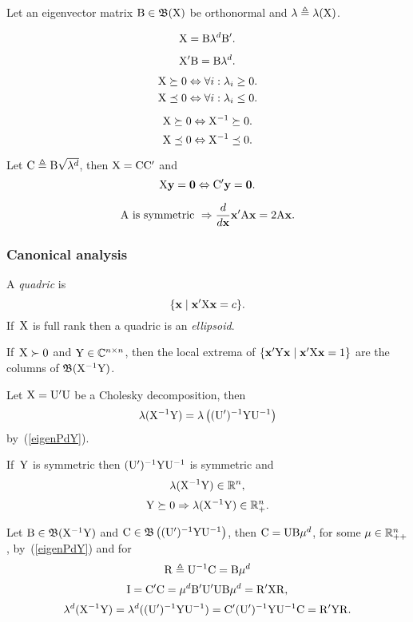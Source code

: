 \documentclass[10pt,a4paper]{article}
\theoremstyle{plain} \newtheorem{Lem}{Lemma}
\begin{document}
Let an eigenvector matrix $\mathrm B \in \mathfrak B (\mathrm X)$ be orthonormal and $\mathbf \lambda \triangleq \mathbf \lambda (\mathrm X)$.

$$  \mathrm X = \mathrm B \mathbf \lambda^d \mathrm B'. $$

$$ \mathrm X' \mathrm B = \mathrm B \mathbf \lambda^d. $$

$$ \mathrm X \succeq 0 \Leftrightarrow \forall i : \lambda_i \ge 0. $$
$$ \mathrm X \preceq 0 \Leftrightarrow \forall i : \lambda_i \le 0. $$

$$ \mathrm X \succeq 0 \Leftrightarrow \mathrm X^{-1} \succeq 0. $$
$$ \mathrm X \preceq 0 \Leftrightarrow \mathrm X^{-1} \preceq 0. $$

Let $\mathrm C \triangleq \mathrm B \sqrt{\mathbf \lambda^d}$,
then $\mathrm X = \mathrm C \mathrm C'$
and
\begin{equation*}
\mathrm X \mathbf y = \mathbf 0 \Leftrightarrow \mathrm C' \mathbf y = \mathbf 0.
\end{equation*}

$$ \mathrm A \text{ is symmetric } \Rightarrow \frac d {d \mathbf x} \mathbf x' \mathrm A \mathbf x = 2 \mathrm A \mathbf x. $$


\subsubsection{Canonical analysis}  \label{CanonicalAnalysis}
A {\em quadric} is
$$ \{\mathbf x \mid \mathbf x' \mathrm X \mathbf x = c\}. $$
If~$\mathrm X$ is full rank then a quadric is an {\em ellipsoid}.

If~$\mathrm X \succ 0$ and $\mathrm Y \in \mathbb C^{n \times n}$, 
then the local extrema of $\{\mathbf x' \mathrm Y \mathbf x \mid \mathbf x' \mathrm X \mathbf x = 1\}$
are the columns of $\mathfrak B(\mathrm X^{-1} \mathrm Y)$.

Let $\mathrm X = \mathrm U' \mathrm U$ be a Cholesky decomposition,
then
$$\mathbf \lambda(\mathrm X^{-1} \mathrm Y) = \mathbf \lambda \left((\mathrm U')^{-1} \mathrm Y \mathrm U^{-1} \right)$$
by~(\ref{eigenPdY}).

\bigskip
If~$\mathrm Y$ is symmetric then $(\mathrm U')^{-1} \mathrm Y \mathrm U^{-1}$ is symmetric
and
$$\mathbf \lambda(\mathrm X^{-1} \mathrm Y) \in \mathbb R^n,$$ 
$$\mathrm Y \succeq 0 \Rightarrow \mathbf \lambda(\mathrm X^{-1} \mathrm Y) \in \mathbb R_+^n.$$ 

Let  $\mathrm B \in \mathfrak B(\mathrm X^{-1} \mathrm Y)$ and $\mathrm C \in \mathfrak B \left((\mathrm U')^{-1} \mathrm Y \mathrm U^{-1} \right)$,
then $\mathrm C = \mathrm U \mathrm B \mathbf \mu^d$, for some $\mathbf \mu \in \mathbb R_{++}^n$, by~(\ref{eigenPdY}) and
for $$ \mathrm R \triangleq \mathrm U^{-1} \mathrm C = \mathrm B \mathbf \mu^d$$
\begin{equation} \label{canonicalWithin}
  \mathrm I = \mathrm C' \mathrm C = \mathbf \mu^d \mathrm B' \mathrm U' \mathrm U \mathrm B \mathbf \mu^d = \mathrm R' \mathrm X \mathrm R, 
\end{equation}
\begin{equation} \label{canonicalBetween}
 \mathbf \lambda^d(\mathrm X^{-1} \mathrm Y) = \mathbf \lambda^d((\mathrm U')^{-1} \mathrm Y \mathrm U^{-1}) = \mathrm C' (\mathrm U')^{-1} \mathrm Y \mathrm U^{-1} \mathrm C 
  = \mathrm R' \mathrm Y \mathrm R. 
\end{equation}
\end{document}
